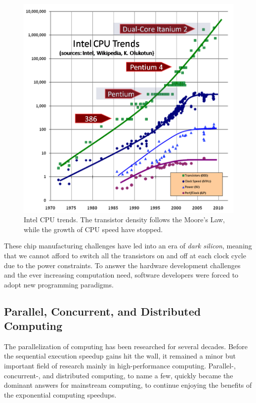 \begin{figure}[]
  \begin{center}
    \includegraphics[width=\textwidth]{images/free-lunch-is-over.png}
    \caption{Intel CPU trends. The transistor density follows the Moore's Law, while the growth of CPU speed have stopped.~\cite{Sutter:2005:FLiO}}
    \label{fig:rne-example}
  \end{center}
\end{figure}

These chip manufacturing challenges have led into an era of \emph{dark silicon}, meaning that we cannot afford to switch all the transistors on and off at each clock cycle due to the power constraints. To answer the hardware development challenges and the ever increasing computation need, software developers were forced to adopt new programming paradigms.~\cite{Sutter:2005:FLiO}

\subsection{Parallel, Concurrent, and Distributed Computing}
\label{subsection:parallel-concurrent-and-distributed-computing}

The parallelization of computing has been researched for several decades. Before the sequential execution speedup gains hit the wall, it remained a minor but important field of research mainly in high-performance computing. Parallel-, concurrent-, and distributed computing, to name a few, quickly became the dominant answers for mainstream computing, to continue enjoying the benefits of the exponential computing speedups.

